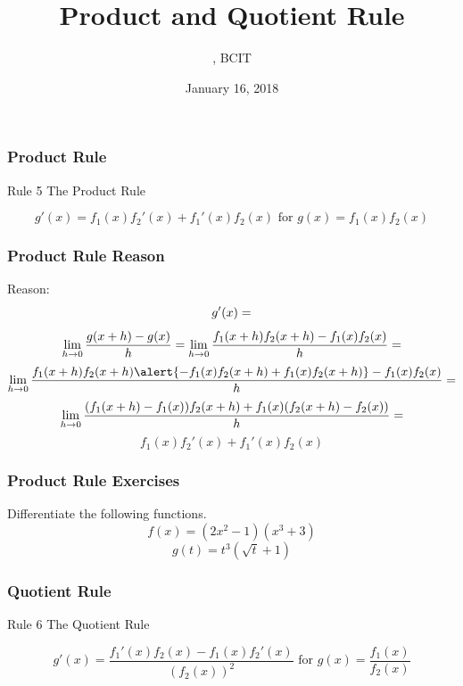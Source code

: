 \documentclass[xcolor=dvipsnames]{beamer}
\title{Product and Quotient Rule}
\subtitle{{\CourseNumber}, BCIT}
\author{\CourseName}
\date{January 16, 2018}
\begin{document}
\begin{frame}
  \titlepage
\end{frame}

\begin{frame}
  \frametitle{Product Rule}
  \begin{block}{Rule 5}
The Product Rule
  \end{block}
\begin{equation}
  \label{eq:aepuaxai}
g'(x)=f_{1}(x)f_{2}'(x)+f_{1}'(x)f_{2}(x)\mbox{ for }g(x)=f_{1}(x)f_{2}(x)
\end{equation}
\end{frame}

\begin{frame}
  \frametitle{Product Rule Reason}
Reason:
\begin{equation}
  \label{eq:yahtiera}
g'(x)=\notag
\end{equation}
\begin{equation}
  \label{eq:piebaith}
\lim_{h\rightarrow{}0}\frac{g(x+h)-g(x)}{h}=\lim_{h\rightarrow{}0}\frac{f_{1}(x+h)f_{2}(x+h)-f_{1}(x)f_{2}(x)}{h}=\notag
\end{equation}
\begin{equation}
  \label{eq:eceishie}
\lim_{h\rightarrow{}0}\frac{f_{1}(x+h)f_{2}(x+h)\alert{-f_{1}(x)f_{2}(x+h)+f_{1}(x)f_{2}(x+h)}-f_{1}(x)f_{2}(x)}{h}=\notag
\end{equation}
\begin{equation}
  \label{eq:chiekeey}
\lim_{h\rightarrow{}0}\frac{(f_{1}(x+h)-f_{1}(x))f_{2}(x+h)+f_{1}(x)(f_{2}(x+h)-f_{2}(x))}{h}=\notag
\end{equation}
\begin{equation}
  \label{eq:vaeyiewe}
f_{1}(x)f_{2}'(x)+f_{1}'(x)f_{2}(x)
\end{equation}
\end{frame}

\begin{frame}
  \frametitle{Product Rule Exercises}
Differentiate the following functions.
\begin{equation}
  \label{eq:iefeiwah}
f(x)=(2x^{2}-1)(x^{3}+3)
\end{equation}
\begin{equation}
  \label{eq:recootie}
g(t)=t^{3}\left(\sqrt{t}+1\right)
\end{equation}
\end{frame}

\begin{frame}
  \frametitle{Quotient Rule}
  \begin{block}{Rule 6}
The Quotient Rule
  \end{block}
\begin{equation}
  \label{eq:roothubu}
g'(x)=\frac{f_{1}'(x)f_{2}(x)-f_{1}(x)f_{2}'(x)}{\left(f_{2}(x)\right)^{2}}\mbox{ for }g(x)=\frac{f_{1}(x)}{f_{2}(x)}
\end{equation}
\end{frame}
\end{document}
